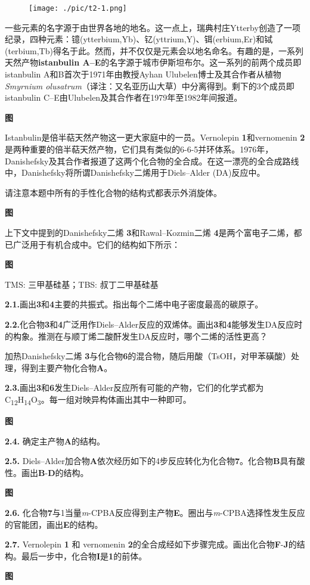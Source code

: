 \begin{figure}[h]
	\centering
	\texttt{[image: ./pic/t2-1.png]}
\end{figure}

一些元素的名字源于由世界各地的地名。这一点上，瑞典村庄Ytterby创造了一项纪录，四种元素：镱(ytterbium,Yb)、钇(yttrium,Y)、铒(erbium,Er)和铽(terbium,Tb)得名于此。然而，并不仅仅是元素会以地名命名。有趣的是，一系列天然产物\textbf{istanbulin A--E}的名字源于城市伊斯坦布尔。这一系列的前两个成员即istanbulin A和B首次于1971年由教授Ayhan Ulubelen博士及其合作者从植物\emph{Smyrnium olusatrum}（译注：又名亚历山大草）中分离得到。剩下的3个成员即istanbulin C--E由Ulubelen及其合作者在1979年至1982年间报道。

\textbf{图}

Istanbulin是倍半萜天然产物这一更大家庭中的一员。Vernolepin \textbf{1}和vernomenin \textbf{2}是两种重要的倍半萜天然产物，它们具有类似的6-6-5并环体系。1976年，Danishefsky及其合作者报道了这两个化合物的全合成。在这一漂亮的全合成路线中，Danishefsky将所谓Danishefsky二烯用于Diels--Alder (DA)反应中。

请注意本题中所有的手性化合物的结构式都表示外消旋体。

\textbf{图}

上下文中提到的Danishefsky二烯 \textbf{3}和Rawal--Kozmin二烯 \textbf{4}是两个富电子二烯，都已广泛用于有机合成中。它们的结构如下所示：

\textbf{图}

TMS: 三甲基硅基；TBS: 叔丁二甲基硅基

\noindent\textbf{2.1.}画出\textbf{3}和\textbf{4}主要的共振式。指出每个二烯中电子密度最高的碳原子。

\noindent\textbf{2.2.}化合物\textbf{3}和\textbf{4}广泛用作Diels--Alder反应的双烯体。画出\textbf{3}和\textbf{4}能够发生DA反应时的构象。推测在与顺丁烯二酸酐发生DA反应时，哪个二烯的活性更高？

加热Danishefsky二烯 \textbf{3}与化合物\textbf{6}的混合物，随后用酸（TsOH，对甲苯磺酸）处理，得到主要产物化合物\textbf{A}。

\noindent\textbf{2.3.}画出\textbf{3}和\textbf{6}发生Diels--Alder反应所有可能的产物，它们的化学式都为C\textsubscript{12}H\textsubscript{14}O\textsubscript{3}。每一组对映异构体画出其中一种即可。

\textbf{图}

\noindent\textbf{2.4.} 确定主产物\textbf{A}的结构。

\noindent\textbf{2.5.} Diels--Alder加合物\textbf{A}依次经历如下的4步反应转化为化合物\textbf{7}。化合物\textbf{B}具有酸性。画出\textbf{B}-\textbf{D}的结构。

\textbf{图}

\noindent\textbf{2.6.} 化合物\textbf{7}与1当量\emph{m}-CPBA反应得到主产物\textbf{E}。圈出与\emph{m}-CPBA选择性发生反应的官能团，画出\textbf{E}的结构。

\noindent\textbf{2.7.} Vernolepin \textbf{1} 和 vernomenin \textbf{2}的全合成经如下步骤完成。画出化合物\textbf{F}-\textbf{J}的结构。最后一步中，化合物\textbf{I}是\textbf{1}的前体。

\textbf{图}